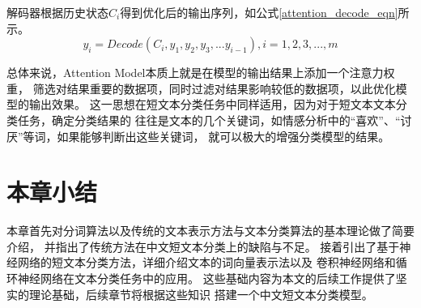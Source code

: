 解码器根据历史状态$C_i$得到优化后的输出序列，如公式\ref{attention_decode_eqn}所示。
\begin{equation}
    y_i=Decode\left ( C_i,y_1,y_2,y_3,...y_{i-1} \right ),i=1,2,3,...,m
    \label{attention_decode_eqn}
\end{equation}

总体来说，Attention Model本质上就是在模型的输出结果上添加一个注意力权重，
筛选对结果重要的数据项，同时过滤对结果影响较低的数据项，以此优化模型的输出效果。
这一思想在短文本分类任务中同样适用，因为对于短文本文本分类任务，确定分类结果的
往往是文本的几个关键词，如情感分析中的“喜欢”、“讨厌”等词，如果能够判断出这些关键词，
就可以极大的增强分类模型的结果。

\section{本章小结}
本章首先对分词算法以及传统的文本表示方法与文本分类算法的基本理论做了简要介绍，
并指出了传统方法在中文短文本分类上的缺陷与不足。
接着引出了基于神经网络的短文本分类方法，详细介绍文本的词向量表示法以及
卷积神经网络和循环神经网络在文本分类任务中的应用。
这些基础内容为本文的后续工作提供了坚实的理论基础，后续章节将根据这些知识
搭建一个中文短文本分类模型。